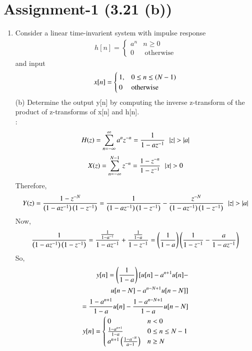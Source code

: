 \documentclass[journal,12pt,twocolumn]{IEEEtran}
\begin{document}
\section{Assignment-1 (3.21 (b))}
\begin{enumerate}
\item Consider a linear time-invarient system with impulse response 
\begin{align}
	h[n]=
	\begin{cases}
		{a^n} & n\geq0 \\
		0 & \ \text{otherwise}
	\end{cases}
\end{align}
and input
\begin{align}
	x[n]=
	\begin{cases}
		1, & 0\leq n \leq\left(N-1\right)\\
		0 & \text{otherwise}
	\end{cases}
\end{align}
(b) Determine the output y[n] by computing the inverse z-transform of the product of z-transforms of x[n] and h[n].\\
\solution:
\begin{align}
	H(z)=\sum_{n=-\infty}^{\infty}a^nz^{-n}=\frac{1}{1-az^{-1}}\:\:\left\vert z\right\vert>\left\vert a\right\vert
\end{align}
\begin{align}
	X(z)=\sum_{n=-\infty}^{N-1}z^{-n}=\frac{{1-z^{-n}}}{1-z^{-1}}\:\:\left\vert x\right\vert>0
\end{align}
Therefore,
\begin{align}
	Y(z)=\frac{1-z^{-N}}{\left(1-az^{-1}\right)\left(1-z^{-1}\right)}=\frac{1}{\left(1-az^{-1}\right)\left(1-z^{-1}\right)}-\frac{z^{-N}}{\left(1-az^{-1}\right)\left(1-z^{-1}\right)}\:\:\left\vert z\right\vert>\left\vert a\right\vert
\end{align}
Now,
\begin{align}
\frac{1}{\left(1-az^{-1}\right)\left(1-z^{-1}\right)}=\frac{\frac{1}{1-a^{-1}}}{1-az^{-1}}+\frac{\frac{1}{1-a}}{1-z^{-1}}=\left(\frac{1}{1-a}\right)\left(\frac{1}{1-z^{-1}}-\frac{a}{1-az^{-1}}\right)	
\end{align}
So,
\begin{align}
	y[n]=\left(\frac{1}{1-a}\right)[u[n]-a^{n+1}u[n]-\\u[n-N]-a^{n-N+1}u[n-N]]
	\\=\frac{1-a^{n+1}}{1-a}u[n]-\frac{1-a^{n-N+1}}{1-a}u[n-N]
	\\y[n]=
	\begin{cases}
		0 & n<0\\
		\frac{1-a^{n+1}}{1-a} & 0 \leq n \leq N-1\\
		a^{n+1}\left(\frac{1-a^{-N}}{a-1}\right) & n \geq N
	\end{cases}
\end{align}
\end{enumerate}
\end{document}
